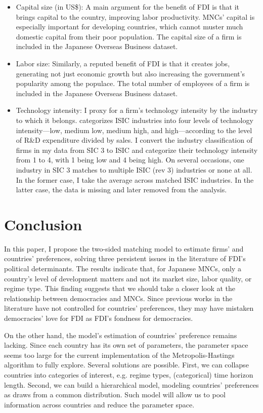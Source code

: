 \begin{itemize}
\item Capital size (in US\$): A main argument for the benefit of FDI is that it brings capital to the country, improving labor productivity. MNCs' capital is especially important for developing countries, which cannot muster much domestic capital from their poor population. The capital size of a firm is included in the Japanese Overseas Business dataset.

\item Labor size: Similarly, a reputed benefit of FDI is that it creates jobs, generating not just economic growth but also increasing the government's popularity among the populace. The total number of employees of a firm is included in the Japanese Overseas Business dataset.

\item Technology intensity: I proxy for a firm's technology intensity by the industry to which it belongs. \citet{OECD2009} categorizes ISIC industries into four levels of technology intensity---low, medium low, medium high, and high---according to the level of R\&D expenditure divided by sales. I convert the industry classification of firms in my data from SIC 3 to ISIC and categorize their technology intensity from 1 to 4, with 1 being low and 4 being high. On several occasions, one industry in SIC 3 matches to multiple ISIC (rev 3) industries or none at all. In the former case, I take the average across matched ISIC industries. In the latter case, the data is missing and later removed from the analysis.
\end{itemize}

\section{Conclusion}
\label{sec:conclusion}

In this paper, I propose the two-sided matching model to estimate firms' and countries' preferences, solving three persistent issues in the literature of FDI's political determinants. The results indicate that, for Japanese MNCs, only a country's level of development matters and not its market size, labor quality, or regime type. This finding suggests that we should take a closer look at the relationship between democracies and MNCs. Since previous works in the literature have not controlled for countries' preferences, they may have mistaken democracies' love for FDI as FDI's fondness for democracies.

On the other hand, the model's estimation of countries' preference remains lacking. Since each country has its own set of parameters, the parameter space seems too large for the current implementation of the Metropolis-Hastings algorithm to fully explore. Several solutions are possible. First, we can collapse countries into categories of interest, e.g. regime types, (categorical) time horizon length. Second, we can build a hierarchical model, modeling countries' preferences as draws from a common distribution. Such model will allow us to pool information across countries and reduce the parameter space.